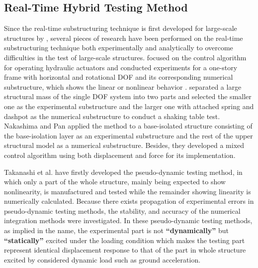 \subsection{Real-Time Hybrid Testing Method}
Since the real-time substructuring technique is first developed for large-scale structures by  \citet{nakashima1992development}, several pieces of research have been performed on the real-time substructuring technique both experimentally and analytically to overcome difficulties in the test of large-scale structures. \citet{blakeborough2001development,darby2001improved} focused on the control algorithm for operating hydraulic actuators and conducted experiments for a one-story frame with horizontal and rotational DOF and its corresponding numerical substructure, which shows the linear or nonlinear behavior \citep{darby2002stability}. \citet{neild2005control} separated a large structural mass of the single DOF system into two parts and selected the smaller one as the experimental substructure and the larger one with attached spring and dashpot as the numerical substructure to conduct a shaking table test\citep{neild2005control}. Nakashima and Pan applied the method to a base-isolated structure consisting of the base-isolation layer as an experimental substructure and the rest of the upper structural model as a numerical substructure\citep{nakashima1999real}. Besides, they developed a mixed control algorithm using both displacement and force for its implementation\citep{pan2005online}.

Takanashi et al. have firstly developed the pseudo-dynamic testing method, in which only a part of the whole structure, mainly being expected to show nonlinearity, is manufactured and tested while the remainder showing linearity is numerically calculated\citep{takanashi1975nonlinear,takanashi1980inelastic}. Because there exists propagation of experimental errors in pseudo-dynamic testing methods, the stability, and accuracy of the numerical integration methods were investigated\citep{shing1983experimental,shing1984pseudodynamic}. In these pseudo-dynamic testing methods, as implied in the name, the experimental part is not \textbf{``dynamically''} but \textbf{``statically''} excited under the loading condition which makes the testing part represent identical displacement response to that of the part in whole structure excited by considered dynamic load such as ground acceleration.

